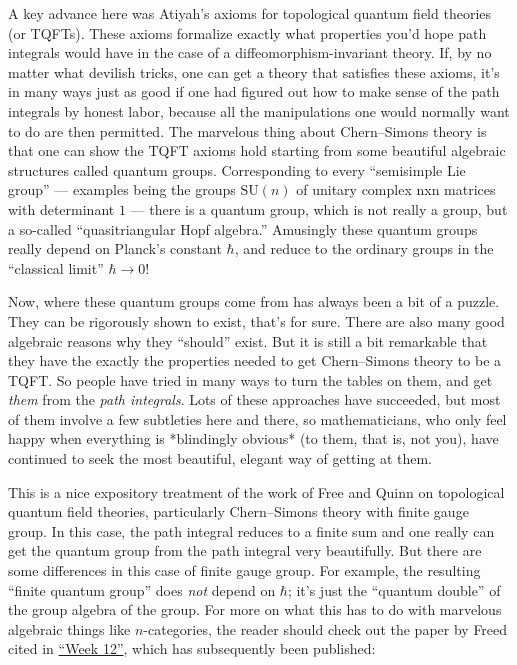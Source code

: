 \documentclass[12pt]{article}
\def\tightlist{}
\renewcommand{\texttt}[1]{%
  \begingroup
  \ttfamily
  \begingroup\lccode`~=`/\lowercase{\endgroup\def~}{/\discretionary{}{}{}}%
  \begingroup\lccode`~=`[\lowercase{\endgroup\def~}{[\discretionary{}{}{}}%
  \begingroup\lccode`~=`.\lowercase{\endgroup\def~}{.\discretionary{}{}{}}%
  \catcode`/=\active\catcode`[=\active\catcode`.=\active
  \scantokens{#1\noexpand}%
  \endgroup
}
\begin{document}
A key advance here was Atiyah's axioms for topological quantum field
theories (or TQFTs). These axioms formalize exactly what properties
you'd hope path integrals would have in the case of a
diffeomorphism-invariant theory. If, by no matter what devilish tricks,
one can get a theory that satisfies these axioms, it's in many ways just
as good if one had figured out how to make sense of the path integrals
by honest labor, because all the manipulations one would normally want
to do are then permitted. The marvelous thing about Chern--Simons theory
is that one can show the TQFT axioms hold starting from some beautiful
algebraic structures called quantum groups. Corresponding to every
``semisimple Lie group'' --- examples being the groups
\(\mathrm{SU}(n)\) of unitary complex nxn matrices with determinant
\(1\) --- there is a quantum group, which is not really a group, but a
so-called ``quasitriangular Hopf algebra.'' Amusingly these quantum
groups really depend on Planck's constant \(\hbar\), and reduce to the
ordinary groups in the ``classical limit'' \(\hbar \to 0\)!

Now, where these quantum groups come from has always been a bit of a
puzzle. They can be rigorously shown to exist, that's for sure. There
are also many good algebraic reasons why they ``should'' exist. But it
is still a bit remarkable that they have the exactly the properties
needed to get Chern--Simons theory to be a TQFT. So people have tried in
many ways to turn the tables on them, and get \emph{them} from the
\emph{path integrals}. Lots of these approaches have succeeded, but most
of them involve a few subtleties here and there, so mathematicians, who
only feel happy when everything is *blindingly obvious* (to them, that
is, not you), have continued to seek the most beautiful, elegant way of
getting at them.


This is a nice expository treatment of the work of Free and Quinn on
topological quantum field theories, particularly Chern--Simons theory
with finite gauge group. In this case, the path integral reduces to a
finite sum and one really can get the quantum group from the path
integral very beautifully. But there are some differences in this case
of finite gauge group. For example, the resulting ``finite quantum
group'' does \emph{not} depend on \(\hbar\); it's just the ``quantum
double'' of the group algebra of the group. For more on what this has to
do with marvelous algebraic things like \(n\)-categories, the reader
should check out the paper by Freed cited in
\protect\hyperlink{week12}{``Week 12''}, which has subsequently been
published:
\end{document}
